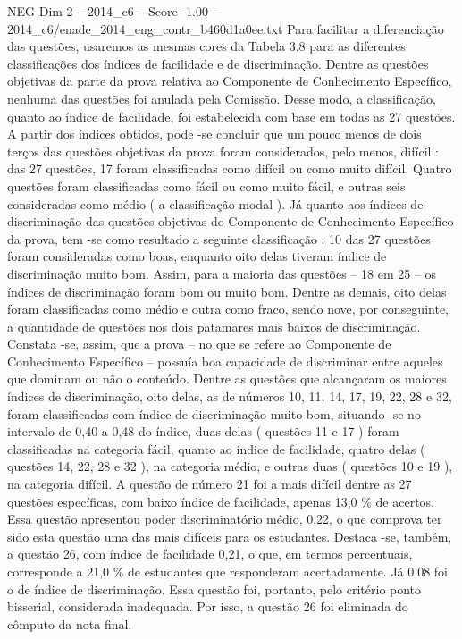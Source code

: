 \begin{textsample}{NEG Dim 2 – 2014\_c6 – Score -1.00 – 2014\_c6/enade\_2014\_eng\_contr\_b460d1a0ee.txt}
Para facilitar a diferenciação das questões, usaremos as mesmas cores da Tabela 3.8 para as diferentes classificações dos índices de facilidade e de discriminação.
Dentre as questões objetivas da parte da prova relativa ao Componente de Conhecimento Específico, nenhuma das questões foi anulada pela Comissão.
Desse modo, a classificação, quanto ao índice de facilidade, foi estabelecida com base em todas as 27 questões.
A partir dos índices obtidos, pode -se concluir que um pouco menos de dois terços das questões objetivas da prova foram considerados, pelo menos, difícil : das 27 questões, 17 foram classificadas como difícil ou como muito difícil.
Quatro questões foram classificadas como fácil ou como muito fácil, e outras seis consideradas como médio ( a classificação modal ).
Já quanto aos índices de discriminação das questões objetivas do Componente de Conhecimento Específico da prova, tem -se como resultado a seguinte classificação : 10 das 27 questões foram consideradas como boas, enquanto oito delas tiveram índice de discriminação muito bom.
Assim, para a maioria das questões – 18 em 25 – os índices de discriminação foram bom ou muito bom.
Dentre as demais, oito delas foram classificadas como médio e outra como fraco, sendo nove, por conseguinte, a quantidade de questões nos dois patamares mais baixos de discriminação.
Constata -se, assim, que a prova – no que se refere ao Componente de Conhecimento Específico – possuía boa capacidade de discriminar entre aqueles que dominam ou não o conteúdo.
Dentre as questões que alcançaram os maiores índices de discriminação, oito delas, as de números 10, 11, 14, 17, 19, 22, 28 e 32, foram classificadas com índice de discriminação muito bom, situando -se no intervalo de 0,40 a 0,48 do índice, duas delas ( questões 11 e 17 ) foram classificadas na categoria fácil, quanto ao índice de facilidade, quatro delas ( questões 14, 22, 28 e 32 ), na categoria médio, e outras duas ( questões 10 e 19 ), na categoria difícil.
A questão de número 21 foi a mais difícil dentre as 27 questões específicas, com baixo índice de facilidade, apenas 13,0 \% de acertos.
Essa questão apresentou poder discriminatório médio, 0,22, o que comprova ter sido esta questão uma das mais difíceis para os estudantes.
Destaca -se, também, a questão 26, com índice de facilidade 0,21, o que, em termos percentuais, corresponde a 21,0 \% de estudantes que responderam acertadamente.
Já 0,08 foi o de índice de discriminação.
Essa questão foi, portanto, pelo critério ponto bisserial, considerada inadequada.
Por isso, a questão 26 foi eliminada do cômputo da nota final.

\end{textsample}
